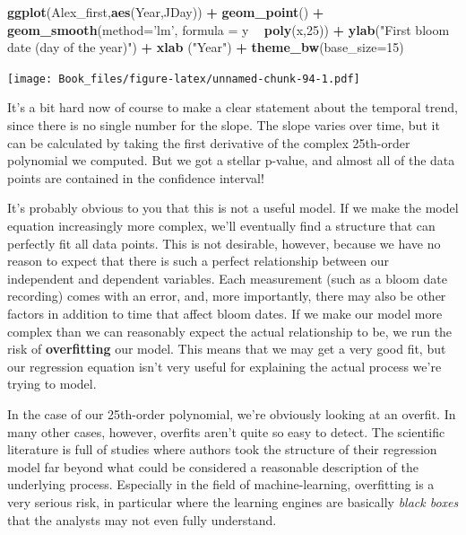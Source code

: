 \documentclass[
]{book}
\newenvironment{Shaded}{\begin{snugshade}}{\end{snugshade}}
\newcommand{\DataTypeTok}[1]{\textcolor[rgb]{0.13,0.29,0.53}{#1}}
\newcommand{\DecValTok}[1]{\textcolor[rgb]{0.00,0.00,0.81}{#1}}
\newcommand{\KeywordTok}[1]{\textcolor[rgb]{0.13,0.29,0.53}{\textbf{#1}}}
\newcommand{\NormalTok}[1]{#1}
\newcommand{\OperatorTok}[1]{\textcolor[rgb]{0.81,0.36,0.00}{\textbf{#1}}}
\newcommand{\StringTok}[1]{\textcolor[rgb]{0.31,0.60,0.02}{#1}}
\begin{document}
\begin{Shaded}
\begin{Highlighting}[]
\KeywordTok{ggplot}\NormalTok{(Alex_first,}\KeywordTok{aes}\NormalTok{(Year,JDay)) }\OperatorTok{+}
\StringTok{  }\KeywordTok{geom_point}\NormalTok{() }\OperatorTok{+}
\StringTok{  }\KeywordTok{geom_smooth}\NormalTok{(}\DataTypeTok{method=}\StringTok{'lm'}\NormalTok{, }\DataTypeTok{formula =}\NormalTok{ y }\OperatorTok{~}\StringTok{ }\KeywordTok{poly}\NormalTok{(x,}\DecValTok{25}\NormalTok{)) }\OperatorTok{+}
\StringTok{  }\KeywordTok{ylab}\NormalTok{(}\StringTok{"First bloom date (day of the year)"}\NormalTok{) }\OperatorTok{+}
\StringTok{  }\KeywordTok{xlab}\NormalTok{ (}\StringTok{"Year"}\NormalTok{) }\OperatorTok{+}
\StringTok{  }\KeywordTok{theme_bw}\NormalTok{(}\DataTypeTok{base_size=}\DecValTok{15}\NormalTok{)}
\end{Highlighting}
\end{Shaded}

\texttt{[image: Book\_files/figure-latex/unnamed-chunk-94-1.pdf]}

It's a bit hard now of course to make a clear statement about the temporal trend, since there is no single number for the slope. The slope varies over time, but it can be calculated by taking the first derivative of the complex 25th-order polynomial we computed. But we got a stellar p-value, and almost all of the data points are contained in the confidence interval!

It's probably obvious to you that this is not a useful model. If we make the model equation increasingly more complex, we'll eventually find a structure that can perfectly fit all data points. This is not desirable, however, because we have no reason to expect that there is such a perfect relationship between our independent and dependent variables. Each measurement (such as a bloom date recording) comes with an error, and, more importantly, there may also be other factors in addition to time that affect bloom dates. If we make our model more complex than we can reasonably expect the actual relationship to be, we run the risk of \textbf{overfitting} our model. This means that we may get a very good fit, but our regression equation isn't very useful for explaining the actual process we're trying to model.

In the case of our 25th-order polynomial, we're obviously looking at an overfit. In many other cases, however, overfits aren't quite so easy to detect. The scientific literature is full of studies where authors took the structure of their regression model far beyond what could be considered a reasonable description of the underlying process. Especially in the field of machine-learning, overfitting is a very serious risk, in particular where the learning engines are basically \emph{black boxes} that the analysts may not even fully understand.
\end{document}
